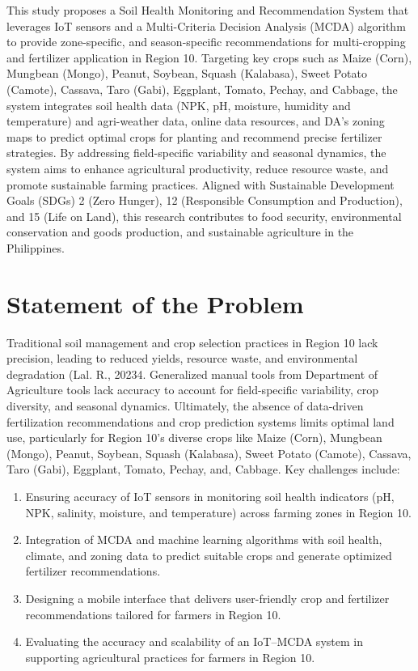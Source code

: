 \begin{doublespace}
This study proposes a Soil Health Monitoring and Recommendation System that leverages IoT sensors and a Multi-Criteria Decision Analysis (MCDA) algorithm to provide zone-specific, and season-specific recommendations for multi-cropping and fertilizer application in Region 10. Targeting key crops such as Maize (Corn), Mungbean (Mongo), Peanut, Soybean, Squash (Kalabasa), Sweet Potato (Camote), Cassava, Taro (Gabi), Eggplant, Tomato, Pechay, and Cabbage, the system integrates soil health data (NPK, pH, moisture, humidity and temperature) and agri-weather data, online data resources, and DA’s zoning maps to predict optimal crops for planting and recommend precise fertilizer strategies. By addressing field-specific variability and seasonal dynamics, the system aims to enhance agricultural productivity, reduce resource waste, and promote sustainable farming practices. Aligned with Sustainable Development Goals (SDGs) 2 (Zero Hunger), 12 (Responsible Consumption and Production), and 15 (Life on Land), this research contributes to food security, environmental conservation and goods production, and sustainable agriculture in the Philippines.


\section{Statement of the Problem}

Traditional soil management and crop selection practices in Region 10 lack precision, leading to reduced yields, resource waste, and environmental degradation (Lal. R., 20234. Generalized manual tools from Department of Agriculture tools lack accuracy to account for field-specific variability, crop diversity, and seasonal dynamics. Ultimately, the absence of data-driven fertilization recommendations and crop prediction systems limits optimal land use, particularly for Region 10’s diverse crops like Maize (Corn), Mungbean (Mongo), Peanut, Soybean, Squash (Kalabasa), Sweet Potato (Camote), Cassava, Taro (Gabi), Eggplant, Tomato, Pechay, and, Cabbage. Key challenges include:

\begin{enumerate}
	\item Ensuring accuracy of IoT sensors in monitoring soil health indicators (pH, NPK, salinity, moisture, and temperature) across farming zones in Region 10.
	\item Integration of MCDA and machine learning algorithms with soil health, climate, and zoning data to predict suitable crops and generate optimized fertilizer recommendations.
	\item Designing a mobile interface that delivers user-friendly crop and fertilizer recommendations tailored for farmers in Region 10.
	\item Evaluating the accuracy and scalability of an IoT–MCDA system in supporting agricultural practices for farmers in Region 10.
\end{enumerate}


\end{doublespace}
